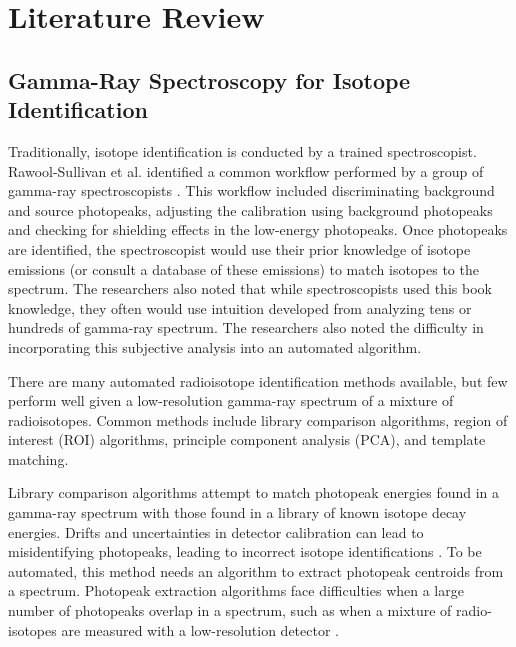 \documentclass[tocnosub,noragright,centerchapter,12pt,fullpage]{uiucecethesis09}
\begin{document}









\chapter{Literature Review}


\section{Gamma-Ray Spectroscopy for Isotope Identification}

Traditionally, isotope identification is conducted by a trained spectroscopist. Rawool-Sullivan et al. identified a common workflow performed by a group of gamma-ray spectroscopists \cite{Sullivan2010}. This workflow included discriminating background and source photopeaks, adjusting the calibration using background photopeaks and checking for shielding effects in the low-energy photopeaks. Once photopeaks are identified, the spectroscopist would use their prior knowledge of isotope emissions (or consult a database of these emissions) to match isotopes to the spectrum. The researchers also noted that while  spectroscopists used this book knowledge, they often would use intuition developed from analyzing tens or hundreds of gamma-ray spectrum. The researchers also noted the difficulty in incorporating this subjective analysis into an automated algorithm.


There are many automated radioisotope identification methods available, but few perform well given a low-resolution gamma-ray spectrum of a mixture of radioisotopes. Common methods include library comparison algorithms, region of interest (ROI) algorithms, principle component analysis (PCA), and template matching.

Library comparison algorithms attempt to match photopeak energies found in a gamma-ray spectrum with those found in a library of known isotope decay energies. Drifts and uncertainties in detector calibration can lead to misidentifying photopeaks, leading to incorrect isotope identifications \cite{burr2009}. To be automated, this method needs an algorithm to extract photopeak centroids from a spectrum. Photopeak extraction algorithms face difficulties when a large number of photopeaks overlap in a spectrum, such as when a mixture of radio-isotopes are measured with a low-resolution detector \cite{xiong2015}.
\end{document}
